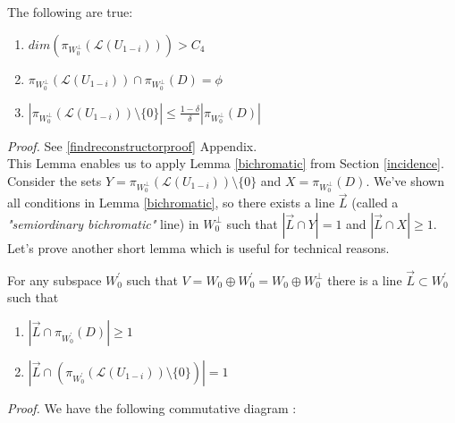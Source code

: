 \documentclass[letterpaper,USenglish,numberwithinsect]{lipics}
\newcommand{\ML}{\mathcal{L}}
\begin{document}
\begin{lemma}\label{findreconstructor}
The following are true:
\begin{enumerate}
 \item $dim(\pi_{W_0^\perp}({\ML(U_{1-i})}))> C_4$
 \item $\pi_{W_0^\perp}({\ML(U_{1-i})})\cap \pi_{W_0^\perp}({D}) = \phi$
 \item $|\pi_{W_0^\perp}({\ML(U_{1-i})})\setminus \{0\}| \leq
\frac{1-\delta}{\delta}|\pi_{W_0^\perp}({D})|$
\end{enumerate}
\end{lemma}


\emph{Proof.}
See \ref{findreconstructorproof} Appendix.\\

This Lemma enables us to apply Lemma \ref{bichromatic} from Section \ref{incidence}.
Consider the sets $Y=\pi_{W_0^\perp}({\ML(U_{1-i})})\setminus \{0\}$ and
$X=\pi_{W_0^\perp}({D})$.
We've shown all conditions in Lemma \ref{bichromatic}, so there exists a line $\vec L$ (called a \emph{"semiordinary bichromatic"} line) in
$W_0^\perp$ such that
$|\vec L\cap Y|=1$ and $|\vec L\cap X|\geq 1$.\\

Let's prove another short lemma which is useful for technical reasons.

\begin{lemma}\label{technical}
For any subspace $W_0^\prime$ such that $V = W_0\oplus W_0^\prime = W_0 \oplus W_0^\perp$ there is a line
$\vec L \subset W_0^\prime$ such that
\begin{enumerate}
\item $|\vec{L} \cap \pi_{W_0^\prime}({D})|\geq 1$
 \item $|\vec L \cap (\pi_{W_0^\prime}({\ML(U_{1-i})})\setminus \{0\})|=1$
\end{enumerate}
\end{lemma}

\emph{Proof.}
We have the following commutative diagram :

\end{document}
